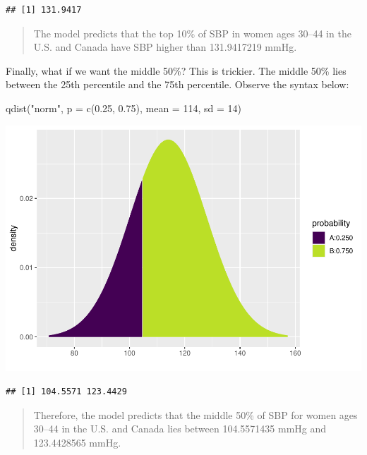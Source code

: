 \documentclass[
]{book}
\newenvironment{Shaded}{\begin{snugshade}}{\end{snugshade}}
\newcommand{\AttributeTok}[1]{\textcolor[rgb]{0.77,0.63,0.00}{#1}}
\newcommand{\DecValTok}[1]{\textcolor[rgb]{0.00,0.00,0.81}{#1}}
\newcommand{\FloatTok}[1]{\textcolor[rgb]{0.00,0.00,0.81}{#1}}
\newcommand{\FunctionTok}[1]{\textcolor[rgb]{0.00,0.00,0.00}{#1}}
\newcommand{\NormalTok}[1]{#1}
\newcommand{\StringTok}[1]{\textcolor[rgb]{0.31,0.60,0.02}{#1}}
\begin{document}
\begin{verbatim}
## [1] 131.9417
\end{verbatim}

\begin{quote}
The model predicts that the top 10\% of SBP in women ages 30--44 in the U.S. and Canada have SBP higher than 131.9417219 mmHg.
\end{quote}

Finally, what if we want the middle 50\%? This is trickier. The middle 50\% lies between the 25th percentile and the 75th percentile. Observe the syntax below:

\begin{Shaded}
\begin{Highlighting}[]
\FunctionTok{qdist}\NormalTok{(}\StringTok{"norm"}\NormalTok{, }\AttributeTok{p =} \FunctionTok{c}\NormalTok{(}\FloatTok{0.25}\NormalTok{, }\FloatTok{0.75}\NormalTok{), }\AttributeTok{mean =} \DecValTok{114}\NormalTok{, }\AttributeTok{sd =} \DecValTok{14}\NormalTok{)}
\end{Highlighting}
\end{Shaded}

\includegraphics{intro_stats_files/figure-latex/unnamed-chunk-349-1.pdf}

\begin{verbatim}
## [1] 104.5571 123.4429
\end{verbatim}

\begin{quote}
Therefore, the model predicts that the middle 50\% of SBP for women ages 30--44 in the U.S. and Canada lies between 104.5571435 mmHg and 123.4428565 mmHg.
\end{quote}
\end{document}
